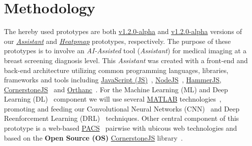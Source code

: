 
\section{Methodology}
\label{sec:sec003}

The hereby used prototypes are both \hyperlink{https://github.com/mida-project/prototype-multi-modality-assistant/releases/tag/v1.2.0-alpha}{v1.2.0-alpha} and \hyperlink{https://github.com/mida-project/prototype-heatmap/releases/tag/v1.2.0-alpha}{v1.2.0-alpha} versions of our {\it \hyperlink{https://github.com/mida-project/prototype-multi-modality-assistant/}{Assistant}} and {\it \hyperlink{https://github.com/mida-project/prototype-heatmap}{Heatpmap}} prototypes, respectively. The purpose of these prototypes is to involve an \textit{AI-Assisted} tool (\textit{Assistant}) for medical imaging at a breast screening diagnosis level\cite{kobashi2017evaluation}. This \textit{Assistant} was created with a front-end and back-end architecture utilizing common programming languages, libraries, frameworks and tools including \hyperlink{https://www.javascript.com/}{JavaScript (JS)}~\cite{flanagan2006javascript}, \hyperlink{https://nodejs.org/}{NodeJS}~\cite{wilson2018node}, \hyperlink{https://hammerjs.github.io/}{HammerJS}, \hyperlink{https://cornerstonejs.org/}{CornerstoneJS}~\cite{hostetter2018integration} and \hyperlink{https://www.orthanc-server.com/}{Orthanc}~\cite{Jodogne:ISBI2013}. For the Machine Learning (ML) and Deep Learning (DL)~\cite{ribeiro2017real, ribeiro2016real} component we will use several \hyperlink{https://www.mathworks.com/products/matlab.html}{MATLAB} technologies~\cite{vedaldi2015matconvnet}, promoting and feeding our Convolutional Neural Networks (CNN)~\cite{carneiro2015unregistered} and Deep Reenforcement Learning (DRL)~\cite{maicas2017deep} techniques. Other central component of this prototype is a web-based \hyperlink{https://www.sciencedirect.com/topics/medicine-and-dentistry/picture-archiving-and-communication-system}{PACS}~\cite{cooke2003picture} pairwise with ubicous web technologies and based on the \textbf{Open Source (OS)} \hyperlink{https://cornerstonejs.org/}{CornerstoneJS} library~\cite{feller2002understanding, hostetter2018integration}.


